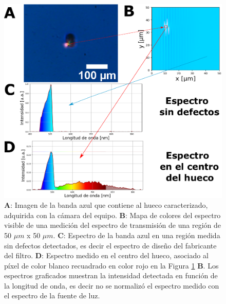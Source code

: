  \begin{figure}[H]
	\centering
	\includegraphics[width=1.0\textwidth]{Figs/microespectrometro/huecocondetalles.png}
	\caption{\textbf{A}: Imagen de la banda azul que contiene al hueco caracterizado, adquirida con la cámara del equipo. \textbf{B}: Mapa de colores del espectro visible de una medición del espectro de transmisión de una región de 50 $\mu m$ x 50 $\mu m$. \textbf{C}: Espectro de la banda azul en una región medida sin defectos detectados, es decir el espectro de diseño del fabricante del filtro. \textbf{D}: Espectro medido en el centro del hueco, asociado al píxel de color blanco recuadrado en color rojo en la Figura \ref{fig:huecoims} \textbf{B}. Los espectros graficados muestran la intensidad detectada en función de la longitud de onda, es decir no se normalizó el espectro medido con el espectro de la fuente de luz.}
	\label{fig:huecoims}
\end{figure}


